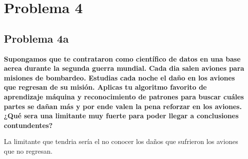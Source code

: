 \section*{Problema 4}
\subsection*{Problema 4a}

\textbf{Supongamos que te contrataron como científico de datos en una base aerea durante la segunda guerra mundial. Cada dia salen aviones para misiones de bombardeo. Estudias cada noche el daño en los aviones que regresan de su misión. Aplicas tu algoritmo favorito de aprendizaje máquina y reconocimiento de patrones para buscar cuáles partes se dañan más y por ende valen la pena reforzar en los aviones. ¿Qué sera una limitante muy fuerte para poder llegar a conclusiones contundentes?
}

La limitante que tendria sería el no conocer los daños que sufrieron los aviones que no regresan.